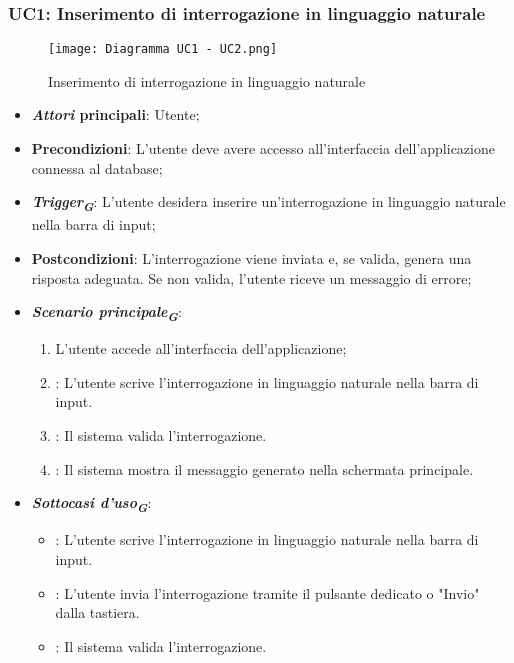 \hypertarget{UC1}{}
\subsubsection{UC1: Inserimento di interrogazione in linguaggio naturale}

\begin{figure}[h]
    \centering
    \texttt{[image: Diagramma UC1 - UC2.png]}
    \caption{Inserimento di interrogazione in linguaggio naturale}
\end{figure}

\begin{itemize}
    \item \textbf{\emph{Attori} principali}: Utente;
    \item \textbf{Precondizioni}: L'utente deve avere accesso all'interfaccia dell'applicazione connessa al database;
    \item \textbf{\emph{Trigger}\textsubscript{\textbf{\textit{G}}}}: L'utente desidera inserire un'interrogazione in linguaggio naturale nella barra di input;
    \item \textbf{Postcondizioni}: L'interrogazione viene inviata e, se valida, genera una risposta adeguata. Se non valida, l'utente riceve un messaggio di errore;
    \item \textbf{\emph{Scenario principale}\textsubscript{\textbf{\textit{G}}}}:
    \begin{enumerate}
        \item L'utente accede all'interfaccia dell'applicazione;
        \item {}: L'utente scrive l'interrogazione in linguaggio naturale nella barra di input.
        \item {}: Il sistema valida l'interrogazione.
        \item {}: Il sistema mostra il messaggio generato nella schermata principale.
    \end{enumerate}
    \item \textbf{\emph{Sottocasi d'uso}\textsubscript{\textbf{\textit{G}}}}:
    \begin{itemize}
        \item {}: L'utente scrive l'interrogazione in linguaggio naturale nella barra di input.
        \item {}: L'utente invia l'interrogazione tramite il pulsante dedicato o "Invio" dalla tastiera.
        \item {}: Il sistema valida l'interrogazione.

\end{itemize}
\end{itemize}
